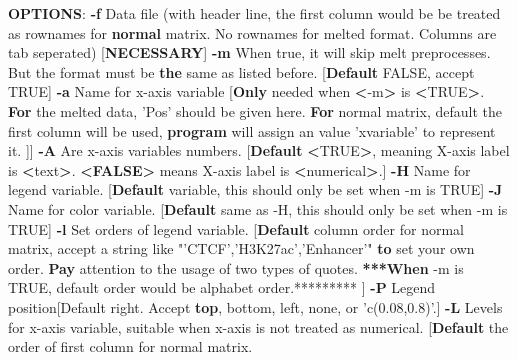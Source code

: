 \documentclass[]{article}
\newenvironment{Shaded}{\begin{snugshade}}{\end{snugshade}}
\newcommand{\KeywordTok}[1]{\textcolor[rgb]{0.13,0.29,0.53}{\textbf{{#1}}}}
\newcommand{\StringTok}[1]{\textcolor[rgb]{0.31,0.60,0.02}{{#1}}}
\newcommand{\NormalTok}[1]{{#1}}
\numberwithin{figure}{section}
\numberwithin{table}{section}
\theoremstyle{definition}
\theoremstyle{definition}
\theoremstyle{definition}
\theoremstyle{remark}
\begin{document}
\begin{Shaded}
\begin{Highlighting}[]
\KeywordTok{OPTIONS}\NormalTok{:}
    \KeywordTok{-f}  \NormalTok{Data file (with header line, the first column would be be treated as rownames for}
        \KeywordTok{normal} \NormalTok{matrix. No rownames for melted format. Columns are tab seperated)}
        \NormalTok{[}\KeywordTok{NECESSARY}\NormalTok{]}
    \KeywordTok{-m}  \NormalTok{When true, it will skip melt preprocesses. But the format must be}
        \KeywordTok{the} \NormalTok{same as listed before.}
        \NormalTok{[}\KeywordTok{Default} \NormalTok{FALSE, accept TRUE]}
    \KeywordTok{-a}  \NormalTok{Name for x-axis variable}
        \NormalTok{[}\KeywordTok{Only} \NormalTok{needed when }\KeywordTok{<}\NormalTok{-m}\KeywordTok{>} \NormalTok{is }\KeywordTok{<}\NormalTok{TRUE}\KeywordTok{>}\NormalTok{.  }
        \KeywordTok{For} \NormalTok{the melted data, }\StringTok{'Pos'} \NormalTok{should be given here. }
        \KeywordTok{For} \NormalTok{normal matrix,  default the first column will be used,}
        \KeywordTok{program} \NormalTok{will assign an value }\StringTok{'xvariable'} \NormalTok{to represent it.}
        \NormalTok{]]}
    \KeywordTok{-A}  \NormalTok{Are x-axis variables numbers.}
        \NormalTok{[}\KeywordTok{Default} \KeywordTok{<}\NormalTok{TRUE}\KeywordTok{>}\NormalTok{, meaning X-axis label is }\KeywordTok{<}\NormalTok{text}\KeywordTok{>}\NormalTok{.}
        \KeywordTok{<FALSE>} \NormalTok{means X-axis label is }\KeywordTok{<}\NormalTok{numerical}\KeywordTok{>}\NormalTok{.]}
    \KeywordTok{-H}  \NormalTok{Name for legend variable.}
        \NormalTok{[}\KeywordTok{Default} \NormalTok{variable, this should only be set when -m is TRUE]}
    \KeywordTok{-J}  \NormalTok{Name for color variable.}
        \NormalTok{[}\KeywordTok{Default} \NormalTok{same as -H, this should only be set when -m is TRUE]}
    \KeywordTok{-l}  \NormalTok{Set orders of legend variable.}
        \NormalTok{[}\KeywordTok{Default} \NormalTok{column order for normal matrix, accept a string like}
        \StringTok{"'CTCF','H3K27ac','Enhancer'"} \KeywordTok{to} \NormalTok{set your own order. }
        \KeywordTok{Pay} \NormalTok{attention to the usage of two types of quotes. }
        \KeywordTok{***When} \NormalTok{-m is TRUE, default order would be alphabet order.********* }
        \NormalTok{]}
    \KeywordTok{-P}  \NormalTok{Legend position[Default right. Accept}
        \KeywordTok{top}\NormalTok{, bottom, left, none, or }\StringTok{'c(0.08,0.8)'}\NormalTok{.]}
    \KeywordTok{-L}  \NormalTok{Levels for x-axis variable, suitable when x-axis is not treated as numerical. }
        \NormalTok{[}\KeywordTok{Default} \NormalTok{the order of first column for normal matrix. }

\end{Highlighting}
\end{Shaded}
\end{document}
